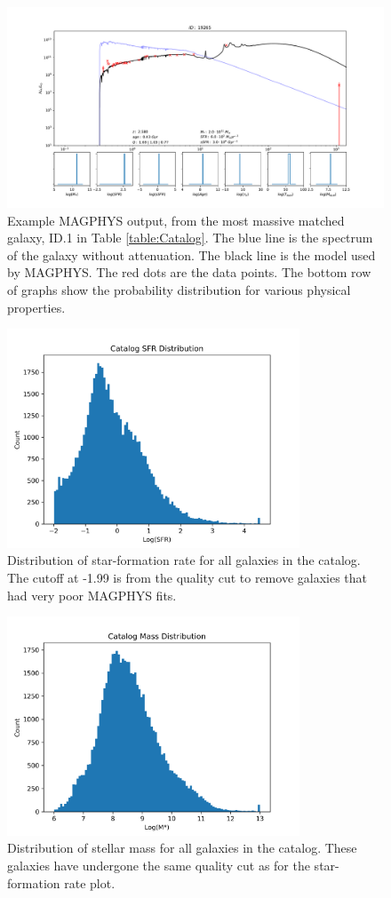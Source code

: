\begin{figure}[!hbp]
\centering \includegraphics[width=160mm]{19265.pdf}
\caption{Example MAGPHYS output, from the most massive matched galaxy, ID.1 in Table \ref{table:Catalog}. The blue line is the spectrum of the galaxy without attenuation. The black line is the model used by MAGPHYS. The red dots are the data points. The bottom row of graphs show the probability distribution for various physical properties.}
\label{fig:MAGPHYS_Example}
\end{figure}

\begin{figure}[!htbp]
\centering \includegraphics[width=87mm]{Survey/MAGPHYS_SFR.png}
\caption{Distribution of star-formation rate for all galaxies in the catalog. The cutoff at -1.99 is from the quality cut to remove galaxies that had very poor MAGPHYS fits.}
\label{fig:MAGPHYS_SFR}
\end{figure}

\begin{figure}[!htbp]
\centering \includegraphics[width=87mm]{Survey/MAGPHYS_Mstar.png}
\caption{Distribution of stellar mass for all galaxies in the catalog. These galaxies have undergone the same quality cut as for the star-formation rate plot.}
\label{fig:MAGPHYS_Mstar}
\end{figure}

